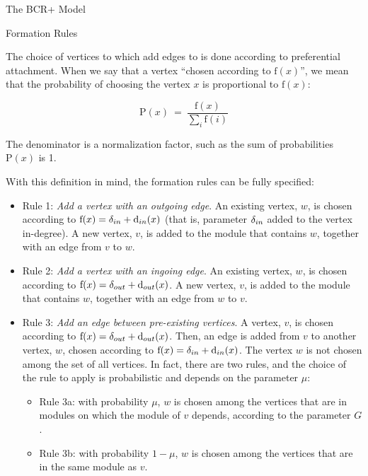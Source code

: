 \documentclass[11pt,twocolumn,a4paper,english]{article}
\begin{document}
\begin{section}{The BCR+ Model}
\begin{subsection}{Formation Rules}
	
	The choice of vertices to which add edges to is done according to preferential attachment. When we say that a vertex ``chosen according to $\mathrm{f}(x)$'', we mean that the probability of choosing the vertex $x$ is proportional to $\mathrm{f}(x)$:
	
	$$
	  \mathrm{P}(x) ~=~ \frac{ \mathrm{f}(x) }
	  { \displaystyle\sum_{i} \mathrm{f}(i) }
	$$
	
	The denominator is a normalization factor, such as the sum of probabilities $\mathrm{P}(x)$ is 1.
	
	With this definition in mind, the formation rules can be fully specified:
	
	\begin{itemize}
		\item Rule 1: \emph{Add a vertex with an outgoing edge}. An existing vertex, $w$, is chosen according to $\mathrm{f}(x) = \delta_{in} + \mathrm{d}_{in}(x)$ (that is, parameter $\delta_{in}$ added to the vertex in-degree). A new vertex, $v$, is added to the module that contains $w$, together with an edge from $v$ to $w$.

		\item Rule 2: \emph{Add a vertex with an ingoing edge}. An existing vertex, $w$, is chosen according to $\mathrm{f}(x) = \delta_{out} + \mathrm{d}_{out}(x)$. A new vertex, $v$, is added to the module that contains $w$, together with an edge from $w$ to $v$.

		\item Rule 3: \emph{Add an edge between pre-existing vertices}. A vertex, $v$, is chosen according to $\mathrm{f}(x) = \delta_{out} + \mathrm{d}_{out}(x)$. Then, an edge is added from $v$ to another vertex, $w$, chosen according to $\mathrm{f}(x) = \delta_{in} + \mathrm{d}_{in}(x)$. The vertex $w$ is not chosen among the set of all vertices. In fact, there are two rules, and the choice of the rule to apply is probabilistic and depends on the parameter $\mu$:

		\begin{itemize}
		  \item Rule 3a: with probability $\mu$, $w$ is chosen among the vertices that are in modules on which the module of $v$ depends, according to the parameter $G$.
		  \item Rule 3b: with probability $1 - \mu$, $w$ is chosen among the vertices that are in the same module as $v$.
		\end{itemize}
	\end{itemize}
		

\end{subsection}
\end{section}
\end{document}
